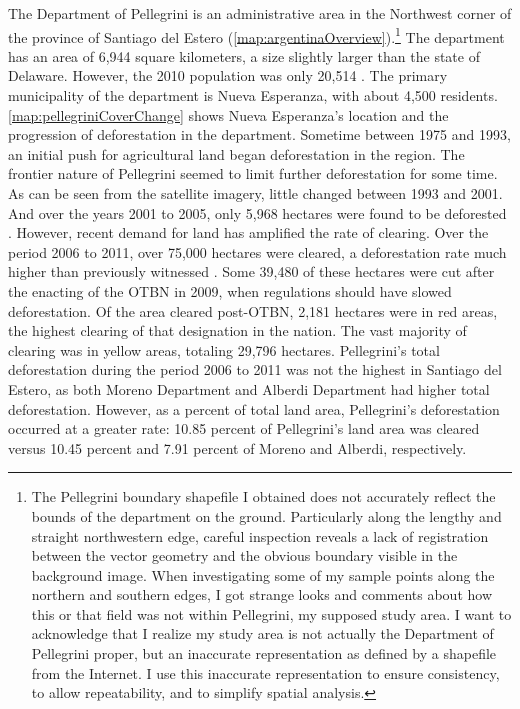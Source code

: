 The Department of Pellegrini is an administrative area in the Northwest corner of the province of Santiago del Estero (\autoref{map:argentinaOverview}).\footnote{The Pellegrini boundary shapefile I obtained does not accurately reflect the bounds of the department on the ground. Particularly along the lengthy and straight northwestern edge, careful inspection reveals a lack of registration between the vector geometry and the obvious boundary visible in the background image. When investigating some of my sample points along the northern and southern edges, I got strange looks and comments about how this or that field was not within Pellegrini, my supposed study area. I want to acknowledge that I realize my study area is not actually the Department of Pellegrini proper, but an inaccurate representation as defined by a shapefile from the Internet. I use this inaccurate representation to ensure consistency, to allow repeatability, and to simplify spatial analysis.} The department has an area of 6,944 square kilometers, a size slightly larger than the state of Delaware. However, the 2010 population was only 20,514 \autocite{estadistica-y-c2010b}. The primary municipality of the department is Nueva Esperanza, with about 4,500 residents. \autoref{map:pellegriniCoverChange} shows Nueva Esperanza's location and the progression of deforestation in the department. Sometime between 1975 and 1993, an initial push for agricultural land began deforestation in the region. The frontier nature of Pellegrini seemed to limit further deforestation for some time. As can be seen from the satellite imagery, little changed between 1993 and 2001. And over the years 2001 to 2005, only 5,968 hectares were found to be deforested \autocite{volante2005analisis}. However, recent demand for land has amplified the rate of clearing. Over the period 2006 to 2011, over 75,000 hectares were cleared, a deforestation rate much higher than previously witnessed \autocite{secreteria-de-a2012monitoreo}. Some 39,480 of these hectares were cut after the enacting of the OTBN in 2009, when regulations should have slowed deforestation. Of the area cleared post-OTBN, 2,181 hectares were in red areas, the highest clearing of that designation in the nation. The vast majority of clearing was in yellow areas, totaling 29,796 hectares. Pellegrini’s total deforestation during the period 2006 to 2011 was not the highest in Santiago del Estero, as both Moreno Department and Alberdi Department had higher total deforestation. However, as a percent of total land area, Pellegrini’s deforestation occurred at a greater rate: 10.85 percent of Pellegrini’s land area was cleared versus 10.45 percent and 7.91 percent of Moreno and Alberdi, respectively.

